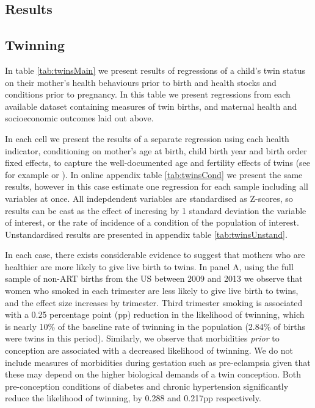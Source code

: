 \documentclass[subeqn]{article}
\begin{document}
\begin{spacing}{1.4}
\section{Results}                                  \label{TWINscn:results}
\subsection{Twinning}                              \label{TWINsscn:twinning}
In table \ref{tab:twinsMain} we present results of regressions of a child's
twin status on their mother's health behaviours prior to birth and health
stocks and conditions prior to pregnancy.  In this table we present regressions
from each available dataset containing measures of twin births, and maternal
health and socioeconomic outcomes laid out above.

In each cell we present the results of a separate regression using each health
indicator, conditioning on mother's age at birth, child birth year and birth
order fixed effects, to capture the well-documented age and fertility effects
of twins (see for example \citet{Hall2003} or \citet{RosenzweigWolpin1980}). In
online appendix table \ref{tab:twinsCond} we present the same results, however
in this case estimate one regression for each sample including all variables at
once. All indepdendent variables are standardised as Z-scores, so results can
be cast as the effect of incresing by 1 standard deviation the variable of
interest, or the rate of incidence of a condition of the population of interest.
Unstandardised results are presented in appendix table \ref{tab:twinsUnstand}.

In each case, there exists considerable evidence to suggest that mothers who
are healthier are more likely to give live birth to twins.  In panel A, using
the full sample of non-ART births from the US between 2009 and 2013 we observe
that women who smoked in each trimester are less likely to give live birth to
twins, and the effect size increases by trimester.  Third trimester smoking is
associated with a 0.25 percentage point (pp) reduction in the likelihood of
twinning, which is nearly 10\% of the baseline rate of twinning in the
population (2.84\% of births were twins in this period).  Similarly, we observe
that morbidities \emph{prior} to conception are associated with a decreased
likelihood of twinning.  We do not include measures of morbidities during
gestation such as pre-eclampsia given that these may depend on the higher
biological demands of a twin conception.  Both pre-conception conditions of
diabetes and chronic hypertension significantly reduce the likelihood of
twinning, by 0.288 and 0.217pp respectively. 


\end{spacing}
\end{document}
